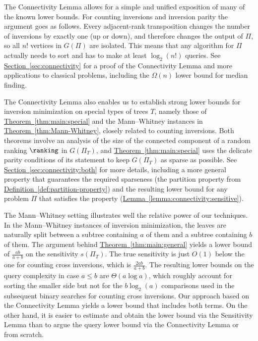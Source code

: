 \documentclass[11pt]{article}
\numberwithin{equation}{section}
\theoremstyle{definition}
\theoremstyle{plain}
\newcommand{\expref}[2]{\hyperref[#2]{#1~\ref{#2}}}
\begin{document}
The Connectivity Lemma allows for a simple and unified exposition of many of the known lower bounds. For counting inversions and inversion parity the argument goes as follows. Every adjacent-rank transposition changes the number of inversions by exactly one (up or down), and therefore changes the output of $\Pi$, so all $n!$ vertices in $G(\Pi)$ are isolated. This means that any algorithm for $\Pi$ actually needs to sort and has to make at least $\log_2(n!)$ queries. See \expref{Section}{sec:connectivity} for a proof of the Connectivity Lemma and more applications to classical problems, including the $\Omega(n)$ lower bound for median finding.

The Connectivity Lemma also enables us to establish strong lower bounds for inversion minimization on special types of trees $T$, namely those of \expref{Theorem}{thm:main:special} and the Mann--Whitney instances in \expref{Theorem}{thm:Mann-Whitney}, closely related to counting inversions. Both theorems involve an analysis of the size of the connected component of a random ranking $\ranking$ in $G(\Pi_T)$, and \expref{Theorem}{thm:main:special} uses the delicate parity conditions of its statement to keep $G(\Pi_T)$ as sparse as possible. See \expref{Section}{sec:connectivity:both} for more details, including a more general property that guarantees the required sparseness (the partition property from \expref{Definition}{def:partition-property}) and the resulting lower bound for any 
%
problem $\Pi$ that satisfies the property (\expref{Lemma}{lemma:connectivity:sensitive}). 

The Mann--Whitney setting illustrates well the relative power of our techniques. In the Mann--Whitney instances of inversion minimization, the leaves are naturally split between a subtree containing $a$ of them and a subtree containing $b$ of them. The argument behind \expref{Theorem}{thm:main:general} yields a lower bound of $\frac{ab}{a+b}$ on the sensitivity $s(\Pi_T)$. The true sensitivity is just $O(1)$ below the one for counting cross inversions, which is $\frac{2ab}{a+b}$. The resulting lower bounds on the query complexity in case $a \le b$ are $\Theta(a \log a)$, which roughly account for sorting the smaller side but not for the $b \log_2(a)$ comparisons used in the subsequent binary searches for counting cross inversions. Our approach based on the Connectivity Lemma yields a lower bound that includes both terms. On the other hand, it is easier to estimate and obtain the lower bound via the Sensitivity Lemma than to argue the query lower bound via the Connectivity Lemma or from scratch. 
\end{document}
